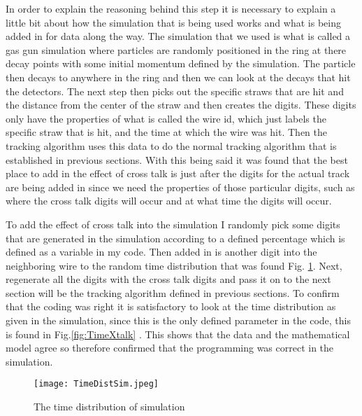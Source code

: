 \documentclass[./Thesis]{subfiles}
\begin{document}
	In order to explain the reasoning behind this step it is necessary to explain a little bit about how the simulation that is being used works and what is being added in for data along the way. The simulation that we used is what is called a gas gun simulation where particles are randomly positioned in the ring at there decay points with some initial momentum defined by the simulation. The particle then decays to anywhere in the ring and then we can look at the decays that hit the detectors. The next step then picks out the specific straws that are hit and the distance from the center of the straw and then creates the digits. These digits only have the properties of what is called the wire id, which just labels the specific straw that is hit, and the time at which the wire was hit. Then the tracking algorithm uses this data to do the normal tracking algorithm that is established in previous sections. With this being said it was found that the best place to add in the effect of cross talk is just after the digits for the actual track are being added in since we need the properties of those particular digits, such as where the cross talk digits will occur and at what time the digits will occur. 
	
	To add the effect of cross talk into the simulation I randomly pick some digits that are generated in the simulation according to a defined percentage which is defined as a variable in my code. Then added in is another digit into the neighboring wire to the random time distribution that was found Fig. \ref{fig:TimeDiffSim}. Next, regenerate all the digits with the cross talk digits and pass it on to the next section will be the tracking algorithm defined in previous sections. To confirm that the coding was right it is satisfactory to look at the time distribution as given in the simulation, since this is the only defined parameter in the code, this is found in Fig.\ref{fig:TimeXtalk} . This shows that the data and the mathematical model agree so therefore confirmed that the programming was correct in the simulation.
\begin{figure}
	\centerline{\texttt{[image: TimeDistSim.jpeg]}}
	\caption[ Time Distribution of Simulation]{ The time distribution of simulation}
	\label{fig:TimeDiffSim}
\end{figure}
	
\end{document}
